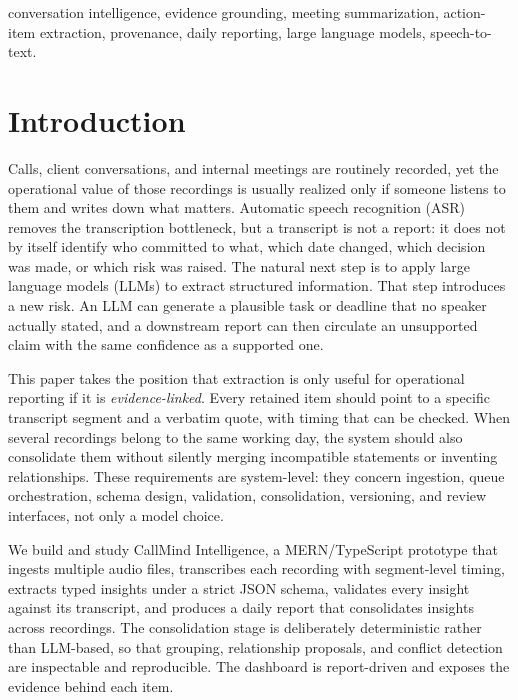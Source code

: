 \documentclass[conference,a4paper]{IEEEtran}
\begin{document}
\begin{IEEEkeywords}
conversation intelligence, evidence grounding, meeting summarization, action-item
extraction, provenance, daily reporting, large language models, speech-to-text.
\end{IEEEkeywords}

\section{Introduction}

Calls, client conversations, and internal meetings are routinely recorded, yet the
operational value of those recordings is usually realized only if someone listens to them
and writes down what matters. Automatic speech recognition (ASR) removes the transcription
bottleneck, but a transcript is not a report: it does not by itself identify who committed
to what, which date changed, which decision was made, or which risk was raised. The
natural next step is to apply large language models (LLMs) to extract structured
information. That step introduces a new risk. An LLM can generate a plausible task or
deadline that no speaker actually stated, and a downstream report can then circulate an
unsupported claim with the same confidence as a supported one.

This paper takes the position that extraction is only useful for operational reporting if
it is \emph{evidence-linked}. Every retained item should point to a specific transcript
segment and a verbatim quote, with timing that can be checked. When several recordings
belong to the same working day, the system should also consolidate them without silently
merging incompatible statements or inventing relationships. These requirements are
system-level: they concern ingestion, queue orchestration, schema design, validation,
consolidation, versioning, and review interfaces, not only a model choice.

We build and study CallMind Intelligence, a MERN/TypeScript prototype that ingests
multiple audio files, transcribes each recording with segment-level timing, extracts typed
insights under a strict JSON schema, validates every insight against its transcript, and
produces a daily report that consolidates insights across recordings. The consolidation
stage is deliberately deterministic rather than LLM-based, so that grouping, relationship
proposals, and conflict detection are inspectable and reproducible. The dashboard is
report-driven and exposes the evidence behind each item.
\end{document}

